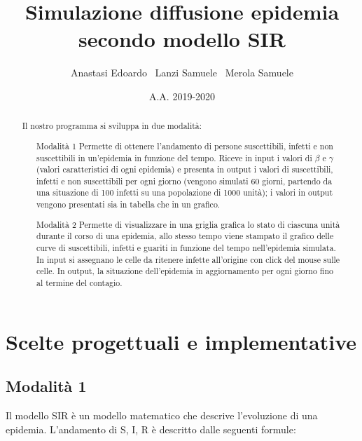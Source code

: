 \documentclass[a4paper,10 pt]{article}
\title{\huge{Simulazione diffusione epidemia secondo modello SIR}}
\author{Anastasi Edoardo \  Lanzi Samuele \ Merola Samuele}
\date{A.A. 2019-2020}
\begin{document}
\maketitle 


\begin{abstract}
 Il nostro programma si sviluppa in due modalità:
 \begin{itemize}
	\item[Modalità 1] Permette di ottenere l'andamento di persone suscettibili, infetti e non suscettibili in un'epidemia in funzione del tempo. Riceve in input i valori di $\beta$ e $\gamma$ (valori caratteristici di ogni epidemia) e presenta in output i valori di suscettibili, infetti e non suscettibili per ogni giorno (vengono simulati 60 giorni, partendo da una situazione di 100 infetti su una popolazione di 1000 unità); i valori in output vengono presentati sia in tabella che in un grafico.
 \item[Modalità 2] Permette di visualizzare in una griglia grafica lo stato di ciascuna unità durante il corso di una epidemia, allo stesso tempo viene stampato il grafico delle curve di suscettibili, infetti e guariti in funzione del tempo nell'epidemia simulata. In input si assegnano le celle da ritenere infette all'origine con click del mouse sulle celle. In output, la situazione dell'epidemia in aggiornamento per ogni giorno fino al termine del contagio.
  \end{itemize}
\end{abstract}



\section{Scelte progettuali e implementative} 
\subsection{Modalità 1}
Il modello SIR è un modello matematico che descrive l'evoluzione di una epidemia. L'andamento di S, I, R è descritto dalle seguenti formule:
\end{document}
